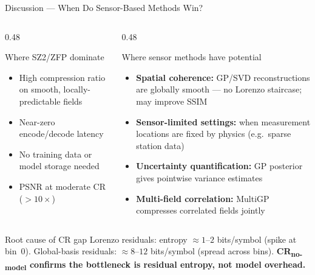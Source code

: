 \documentclass[aspectratio=169, 11pt]{beamer}
\begin{document}
\begin{frame}{Discussion — When Do Sensor-Based Methods Win?}
\begin{columns}[T]

\begin{column}{0.48\textwidth}
  \begingroup
  \begin{block}{Where SZ2/ZFP dominate}
    \begin{itemize}\setlength\itemsep{0.25em}\scriptsize
      \item High compression ratio on smooth, locally-predictable fields
      \item Near-zero encode/decode latency
      \item No training data or model storage needed
      \item PSNR at moderate CR ($>10\times$)
    \end{itemize}
  \end{block}
  \endgroup
\end{column}

\begin{column}{0.48\textwidth}
  \begingroup
  \begin{block}{Where sensor methods have potential}
    \begin{itemize}\setlength\itemsep{0.25em}\scriptsize
      \item \textbf{Spatial coherence:} GP/SVD reconstructions are globally smooth — no Lorenzo staircase; may improve SSIM
      \item \textbf{Sensor-limited settings:} when measurement locations are fixed by physics (e.g.\ sparse station data)
      \item \textbf{Uncertainty quantification:} GP posterior gives pointwise variance estimates
      \item \textbf{Multi-field correlation:} MultiGP compresses correlated fields jointly
    \end{itemize}
  \end{block}
  \endgroup
\end{column}

\end{columns}

\vspace{0.2em}
\begingroup
{}
\begin{block}{Root cause of CR gap}
  \scriptsize
  Lorenzo residuals: entropy $\approx\!1$–$2$ bits/symbol (spike at bin~0). \enspace
  Global-basis residuals: $\approx\!8$–$12$ bits/symbol (spread across bins). \enspace
  \textbf{CR\textsubscript{no-model} confirms the bottleneck is residual entropy, not model overhead.}
\end{block}
\endgroup

\end{frame}
\end{document}
